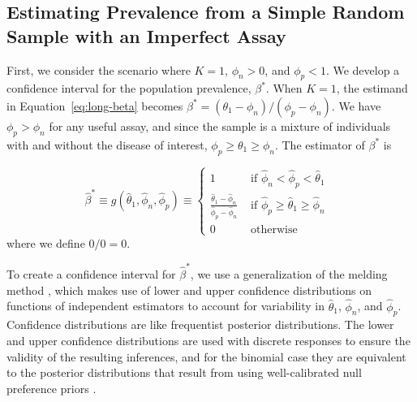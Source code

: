 \documentclass[AMA,STIX1COL]{WileyNJD-v2}
\begin{document}
\subsection{Estimating Prevalence from a Simple Random Sample with an Imperfect Assay}
\label{sec:srs-imperfect}

First, we consider the scenario where \( K = 1 \), \( \phi_n > 0 \), and \( \phi_p < 1 \).
We develop a confidence interval for the population prevalence, \( \beta^* \).
When \( K = 1 \), the estimand in Equation~\ref{eq:long-beta} becomes $\beta^* = (\theta_1 - \phi_n)/(\phi_p-\phi_n)$. We have $\phi_p > \phi_n$ for any useful assay, and since the sample is a mixture of individuals with and without the disease of interest, $\phi_p \geq \theta_1 \geq \phi_n$. The estimator of $\beta^*$ is 

\begin{equation}
\hat{\beta}^* \equiv 
g(\hat{\theta}_1, \hat{\phi}_n, \hat{\phi}_p)
\equiv 
\left\{ 
\begin{array}{ll}
1 & \mbox{ if $\hat{\phi}_n < \hat{\phi}_p < \hat{\theta}_1$ }  \\
\frac{\hat{\theta}_1 - \hat{\phi}_n}{\hat{\phi}_p - \hat{\phi}_n} & 
\mbox{ if $\hat{\phi}_p \geq \hat{\theta}_1 \geq \hat{\phi}_n$ } \\
0 & \mbox{ otherwise} 
\end{array}
\right.
\label{eq:srs-beta-est}
\end{equation}
where we define $0/0=0$.



To create a confidence interval for \( \hat{\beta}^* \), we use a generalization of the melding method \cite{FayP:2015}, which makes use of lower and upper confidence distributions on functions of independent estimators to account for variability in \( \hat{\theta}_1 \), \( \hat{\phi}_n \), and \( \hat{\phi}_p \). Confidence distributions are like frequentist posterior distributions\cite{Xie2013}.
The lower and upper confidence distributions are used with discrete responses to ensure the validity of the resulting inferences, and for the binomial case they are equivalent to the posterior distributions that result from using well-calibrated null preference priors \cite{Fay2021}.
\end{document}
